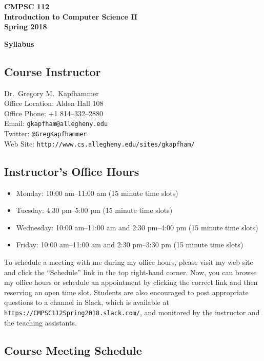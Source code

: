 \documentclass[11pt]{article}
\newcommand{\url}[1]{\lstinline{#1}}
\newcommand{\syllabustitle}[1]
{
  \begin{center}
    \begin{center}
      \bf
      CMPSC 112\\Introduction to Computer Science II\\
      Spring 2018\\
      \medskip
    \end{center}
    \bf
    #1
  \end{center}
}
\begin{document}
\thispagestyle{empty}

\syllabustitle{Syllabus}

\vspace*{-.1in}
\subsection*{Course Instructor}
Dr.\ Gregory M.\ Kapfhammer\\
\noindent Office Location: Alden Hall 108 \\
\noindent Office Phone: +1 814--332--2880 \\
\noindent Email: \url{gkapfham@allegheny.edu} \\
\noindent Twitter: \url{@GregKapfhammer} \\
\noindent Web Site: \url{http://www.cs.allegheny.edu/sites/gkapfham/}

\subsection*{Instructor's Office Hours}

\begin{itemize}
  \itemsep0em

  \item Monday: 10:00 am--11:00 am (15 minute time slots)

  \item Tuesday: 4:30 pm--5:00 pm (15 minute time slots)

  \item Wednesday: 10:00 am--11:00 am and 2:30 pm--4:00 pm (15 minute time slots)

  \item Friday: 10:00 am--11:00 am and 2:30 pm--3:30 pm (15 minute time slots)

\end{itemize}

\vspace*{-.1in}

\noindent To schedule a meeting with me during my office hours, please visit my web site and click the ``Schedule'' link
in the top right-hand corner. Now, you can browse my office hours or schedule an appointment by clicking the correct
link and then reserving an open time slot. Students are also encouraged to post appropriate questions to a channel in
Slack, which is available at \url{https://CMPSC112Spring2018.slack.com/}, and monitored by the instructor and the
teaching assistants.

\subsection*{Course Meeting Schedule}
\end{document}

